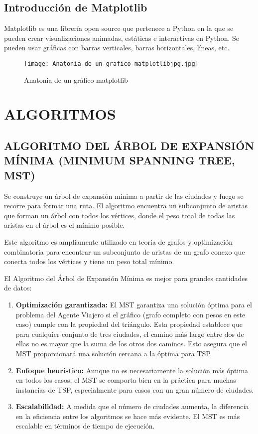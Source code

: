 \documentclass{article}
\begin{document}
\subsection{Introducción de Matplotlib}
Matplotlib es una librería open source que pertenece a Python en la que se pueden crear visualizaciones animadas, estáticas e interactivas en Python. Se pueden usar gráficas con barras verticales, barras horizontales, líneas, etc.

\begin{figure}[H]
\centering
\texttt{[image: Anatonia-de-un-grafico-matplotlibjpg.jpg]}
\caption{\label{fig:matplotlib}Anatonia de un gráfico matplotlib}
\end{figure}



\section{ALGORITMOS}
\subsection{ALGORITMO DEL ÁRBOL DE EXPANSIÓN MÍNIMA (MINIMUM SPANNING TREE, MST)}
Se construye un árbol de expansión mínima a partir de las ciudades y luego se recorre para formar una ruta. El algoritmo encuentra un subconjunto de aristas que forman un árbol con todos los vértices, donde el peso total de todas las aristas en el árbol es el mínimo posible.

Este algoritmo es ampliamente utilizado en teoría de grafos y optimización combinatoria para encontrar un subconjunto de aristas de un grafo conexo que conecta todos los vértices y tiene un peso total mínimo.

El Algoritmo del Árbol de Expansión Mínima es mejor para grandes cantidades de datos:

    \begin{enumerate}
        \item \textbf{Optimización garantizada:} El MST garantiza una solución óptima para el problema del Agente Viajero si el gráfico (grafo completo con pesos en este caso) cumple con la propiedad del triángulo. Esta propiedad establece que para cualquier conjunto de tres ciudades, el camino más largo entre dos de ellas no es mayor que la suma de los otros dos caminos. Esto asegura que el MST proporcionará una solución cercana a la óptima para TSP.
        
        \item \textbf{Enfoque heurístico:} Aunque no es necesariamente la solución más óptima en todos los casos, el MST se comporta bien en la práctica para muchas instancias de TSP, especialmente para casos con un gran número de ciudades.
        
        \item \textbf{Escalabilidad:} A medida que el número de ciudades aumenta, la diferencia en la eficiencia entre los algoritmos se hace más evidente. El MST es más escalable en términos de tiempo de ejecución.
    \end{enumerate}
\end{document}
